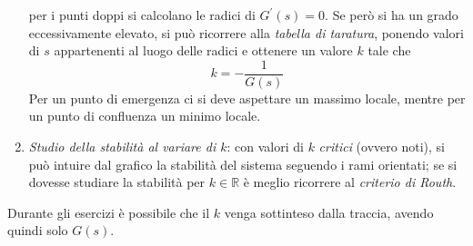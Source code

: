 \begin{enumerate}
		per i punti doppi si calcolano le radici di \(G^\prime(s) = 0\).
		Se però si ha un grado eccessivamente elevato, si può ricorrere
		alla \emph{tabella di taratura}, ponendo valori di \(s\) appartenenti
		al luogo delle radici e ottenere un valore \(k\) tale che
		\[
			k = -\frac{1}{G(s)}
		\]
		Per un punto di emergenza ci si deve aspettare un massimo locale,
		mentre per un punto di confluenza un minimo locale.
	\item \emph{Studio della stabilità al variare di \(k\)}: con valori
		di \(k\) \emph{critici} (ovvero noti), si può intuire
		dal grafico la stabilità del sistema seguendo i rami orientati;
		se si dovesse studiare la stabilità per \(k \in \mathbb{R}\) è
		meglio ricorrere al \emph{criterio di Routh}.
\end{enumerate}

\begin{nota}
Durante gli esercizi è possibile che il \(k\) venga sottinteso dalla traccia,
avendo quindi solo \(G(s)\).
\end{nota}

